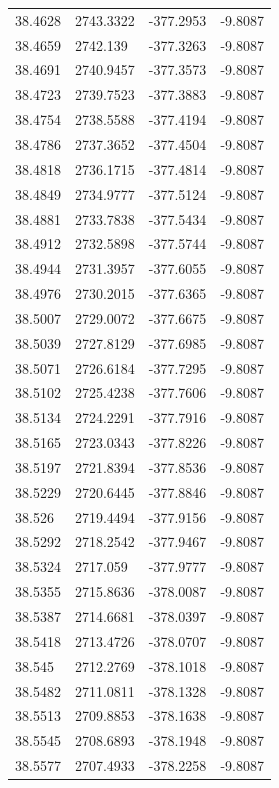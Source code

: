 \begin{table}[H]
\begin{tabular}{llll}
38.4628 & 2743.3322 & -377.2953 & -9.8087 \\
38.4659 & 2742.139 & -377.3263 & -9.8087 \\
38.4691 & 2740.9457 & -377.3573 & -9.8087 \\
38.4723 & 2739.7523 & -377.3883 & -9.8087 \\
38.4754 & 2738.5588 & -377.4194 & -9.8087 \\
38.4786 & 2737.3652 & -377.4504 & -9.8087 \\
38.4818 & 2736.1715 & -377.4814 & -9.8087 \\
38.4849 & 2734.9777 & -377.5124 & -9.8087 \\
38.4881 & 2733.7838 & -377.5434 & -9.8087 \\
38.4912 & 2732.5898 & -377.5744 & -9.8087 \\
38.4944 & 2731.3957 & -377.6055 & -9.8087 \\
38.4976 & 2730.2015 & -377.6365 & -9.8087 \\
38.5007 & 2729.0072 & -377.6675 & -9.8087 \\
38.5039 & 2727.8129 & -377.6985 & -9.8087 \\
38.5071 & 2726.6184 & -377.7295 & -9.8087 \\
38.5102 & 2725.4238 & -377.7606 & -9.8087 \\
38.5134 & 2724.2291 & -377.7916 & -9.8087 \\
38.5165 & 2723.0343 & -377.8226 & -9.8087 \\
38.5197 & 2721.8394 & -377.8536 & -9.8087 \\
38.5229 & 2720.6445 & -377.8846 & -9.8087 \\
38.526 & 2719.4494 & -377.9156 & -9.8087 \\
38.5292 & 2718.2542 & -377.9467 & -9.8087 \\
38.5324 & 2717.059 & -377.9777 & -9.8087 \\
38.5355 & 2715.8636 & -378.0087 & -9.8087 \\
38.5387 & 2714.6681 & -378.0397 & -9.8087 \\
38.5418 & 2713.4726 & -378.0707 & -9.8087 \\
38.545 & 2712.2769 & -378.1018 & -9.8087 \\
38.5482 & 2711.0811 & -378.1328 & -9.8087 \\
38.5513 & 2709.8853 & -378.1638 & -9.8087 \\
38.5545 & 2708.6893 & -378.1948 & -9.8087 \\
38.5577 & 2707.4933 & -378.2258 & -9.8087 \\

\end{tabular}
\end{table}
